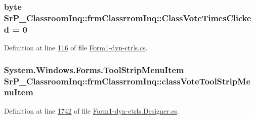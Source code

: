 \hypertarget{class_sr_p___classroom_inq_1_1frm_classrrom_inq_ab63c943c019363dba6aa86686b9f2bf6}{
\subsubsection[{\-Class\-Vote\-Times\-Clicked}]{\setlength{\rightskip}{0pt plus 5cm}byte {\bf \-Sr\-P\-\_\-\-Classroom\-Inq\-::frm\-Classrrom\-Inq\-::\-Class\-Vote\-Times\-Clicked} = 0}}
\label{class_sr_p___classroom_inq_1_1frm_classrrom_inq_ab63c943c019363dba6aa86686b9f2bf6}


\-Definition at line \hyperlink{_form1-dyn-ctrls_8cs_source_l00116}{116} of file \hyperlink{_form1-dyn-ctrls_8cs_source}{\-Form1-\/dyn-\/ctrls.\-cs}.

\hypertarget{class_sr_p___classroom_inq_1_1frm_classrrom_inq_add88d2c77e31773b18b9a6b571f3207f}{
\subsubsection[{class\-Vote\-Tool\-Strip\-Menu\-Item}]{\setlength{\rightskip}{0pt plus 5cm}\-System.\-Windows.\-Forms.\-Tool\-Strip\-Menu\-Item {\bf \-Sr\-P\-\_\-\-Classroom\-Inq\-::frm\-Classrrom\-Inq\-::class\-Vote\-Tool\-Strip\-Menu\-Item}}}
\label{class_sr_p___classroom_inq_1_1frm_classrrom_inq_add88d2c77e31773b18b9a6b571f3207f}


\-Definition at line \hyperlink{_form1-dyn-ctrls_8_designer_8cs_source_l01742}{1742} of file \hyperlink{_form1-dyn-ctrls_8_designer_8cs_source}{\-Form1-\/dyn-\/ctrls.\-Designer.\-cs}.

